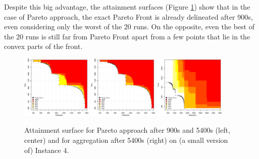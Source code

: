 \documentclass{llncs}
\begin{document}
Despite this big advantage, the attainment surfaces (Figure \ref{medium_eaf}) show that in the case of Pareto approach, the exact Pareto Front is already delineated after 900s, even considering only the worst of the 20 runs. On the opposite, even the best of the 20 runs is still far from Pareto Front apart from a few points that lie in the convex parts of the front.


\begin{figure}[tb]
  \centering
      \includegraphics[width=0.30\textwidth]{medium_att_area_EAFALL_900}
      \includegraphics[width=0.30\textwidth]{medium_att_area_EAFALL}
      \includegraphics[width=0.30\textwidth]{medium_aggreg_att_area}
 \caption{\label{medium_eaf} Attainment surface for Pareto approach after 900s and 5400s (left, center) and for aggregation after 5400s (right) on (a small version of) Instance 4.}
\end{figure}

\end{document}
